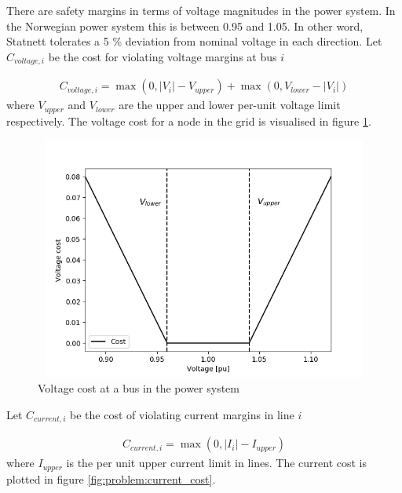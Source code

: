 \documentclass[class=book, crop=false]{standalone}
\begin{document}
There are safety margins in terms of voltage magnitudes in the power system. In the Norwegian power system this is between 0.95 and 1.05. In other word, Statnett tolerates a 5 \% deviation from nominal voltage in each direction. Let $C_{voltage,i}$ be the cost for violating voltage margins at bus $i$


\begin{equation}
   \begin{aligned}
   \label{eq:problem:voltage_margins_cost}
    C_{voltage,i} = \max(0,|V_{i}| - V_{upper}) + \max(0,V_{lower}- |V_{i}|)
    \end{aligned} 
\end{equation}
where $V_{upper}$ and $V_{lower}$ are the upper and lower per-unit voltage limit respectively. The voltage cost for a node in the grid is visualised in figure \ref{fig:problem:voltage_cost}.
\begin{figure}[ht]
    \center
\includegraphics[height=8cm, width=12cm]{figures/voltage_cost.png}
    \caption[size = 9]{Voltage cost at a bus in the power system}
    \label{fig:problem:voltage_cost}
\end{figure}

Let $C_{current,i}$ be the cost of violating current margins in line $i$

\begin{equation}
   \begin{aligned}
   \label{eq:problem:current_margins_cost}
    C_{current,i} = \max(0,|I_{i}| - I_{upper})
    \end{aligned} 
\end{equation}
where $I_{upper}$ is the per unit upper current limit in lines. The current cost is plotted in figure  \ref{fig:problem:current_cost}.
\end{document}
